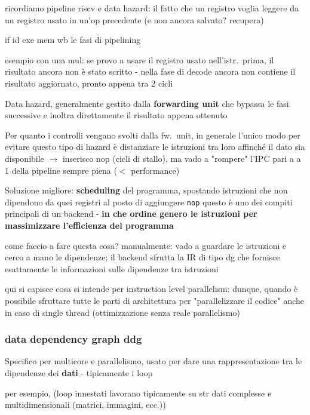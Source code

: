 ricordiamo pipeline riscv e data hazard: il fatto che un registro voglia leggere da un registro usato in un'op precedente (e non ancora salvato? recupera)

if id exe mem wb le fasi di pipelining

esempio con una mul: se provo a usare il registro usato nell'istr.~prima, il risultato ancora non \`e stato scritto - nella fase di decode ancora non contiene il risultato aggiornato, pronto appena tra 2 cicli

Data hazard, generalmente gestito dalla \textbf{forwarding unit} che bypassa le fasi successive e inoltra direttamente il risultato appena ottenuto

\begin{emphasize}
  Per quanto i controlli vengano svolti dalla fw.~unit, in generale l'unico modo per evitare questo tipo di hazard \`e distanziare le istruzioni tra loro affinch\'e il dato sia disponibile $\rightarrow$ inserisco nop (cicli di stallo), ma vado a "rompere" l'IPC pari a a 1 della pipeline sempre piena ($<$ performance)
\end{emphasize}

Soluzione migliore: \textbf{scheduling} del programma, spostando istruzioni che non dipendono da quei registri al posto di aggiungere \lstinline|nop|
questo \`e uno dei compiti principali di un backend - \textbf{in che ordine genero le istruzioni per massimizzare l'efficienza del programma}

come faccio a fare questa cosa? manualmente: vado a guardare le istruzioni e cerco a mano le dipendenze; il backend sfrutta la IR di tipo dg che fornisce esattamente le informazioni sulle dipendenze tra istruzioni

qui si capisce cosa si intende per instruction level parallelism: dunque, quando \`e possibile sfruttare tutte le parti di architettura per "parallelizzare il codice" anche in caso di single thread (ottimizzazione senza reale parallelismo)


\subsubsection{data dependency graph ddg}

Specifico per multicore e parallelismo, usato per dare una rappresentazione tra le dipendenze dei \textbf{dati} - tipicamente i loop

per esempio, (loop innestati lavorano tipicamente su str dati complesse e multidimensionali (matrici, immagini, ecc.))

